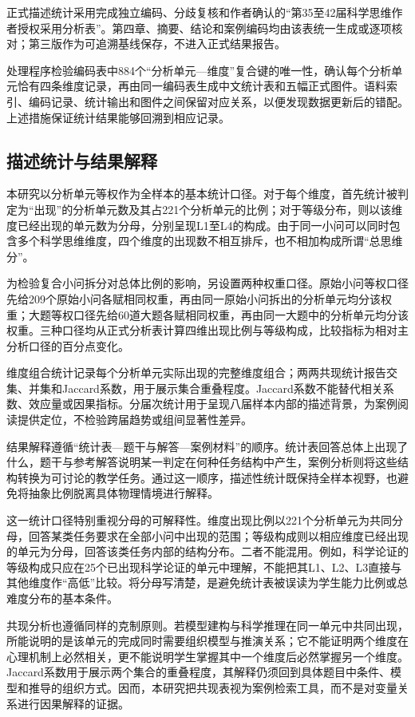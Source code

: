 \documentclass[
  12pt,
  a4paper,twoside,openany]{ctexbook}
\begin{document}
正式描述统计采用完成独立编码、分歧复核和作者确认的``第35至42届科学思维作者授权采用分析表''。第四章、摘要、结论和案例编码均由该表统一生成或逐项核对；第三版作为可追溯基线保存，不进入正式结果报告。

处理程序检验编码表中884个``分析单元---维度''复合键的唯一性，确认每个分析单元恰有四条维度记录，再由同一编码表生成中文统计表和五幅正式图件。语料索引、编码记录、统计输出和图件之间保留对应关系，以便发现数据更新后的错配。上述措施保证统计结果能够回溯到相应记录。

\subsection{描述统计与结果解释}\label{ux63cfux8ff0ux7edfux8ba1ux4e0eux7ed3ux679cux89e3ux91ca}

本研究以分析单元等权作为全样本的基本统计口径。对于每个维度，首先统计被判定为``出现''的分析单元数及其占221个分析单元的比例；对于等级分布，则以该维度已经出现的单元数为分母，分别呈现L1至L4的构成。由于同一小问可以同时包含多个科学思维维度，四个维度的出现数不相互排斥，也不相加构成所谓``总思维分''。

为检验复合小问拆分对总体比例的影响，另设置两种权重口径。原始小问等权口径先给209个原始小问各赋相同权重，再由同一原始小问拆出的分析单元均分该权重；大题等权口径先给60道大题各赋相同权重，再由同一大题中的分析单元均分该权重。三种口径均从正式分析表计算四维出现比例与等级构成，比较指标为相对主分析口径的百分点变化。

维度组合统计记录每个分析单元实际出现的完整维度组合；两两共现统计报告交集、并集和Jaccard系数，用于展示集合重叠程度。Jaccard系数不能替代相关系数、效应量或因果指标。分届次统计用于呈现八届样本内部的描述背景，为案例阅读提供定位，不检验跨届趋势或组间显著性差异。

结果解释遵循``统计表---题干与解答---案例材料''的顺序。统计表回答总体上出现了什么，题干与参考解答说明某一判定在何种任务结构中产生，案例分析则将这些结构转换为可讨论的教学任务。通过这一顺序，描述性统计既保持全样本视野，也避免将抽象比例脱离具体物理情境进行解释。

这一统计口径特别重视分母的可解释性。维度出现比例以221个分析单元为共同分母，回答某类任务要求在全部小问中出现的范围；等级构成则以相应维度已经出现的单元为分母，回答该类任务内部的结构分布。二者不能混用。例如，科学论证的等级构成只应在25个已出现科学论证的单元中理解，不能把其L1、L2、L3直接与其他维度作``高低''比较。将分母写清楚，是避免统计表被误读为学生能力比例或总难度分布的基本条件。

共现分析也遵循同样的克制原则。若模型建构与科学推理在同一单元中共同出现，所能说明的是该单元的完成同时需要组织模型与推演关系；它不能证明两个维度在心理机制上必然相关，更不能说明学生掌握其中一个维度后必然掌握另一个维度。Jaccard系数用于展示两个集合的重叠程度，其解释仍须回到具体题目中条件、模型和推导的组织方式。因而，本研究把共现表视为案例检索工具，而不是对变量关系进行因果解释的证据。
\end{document}
